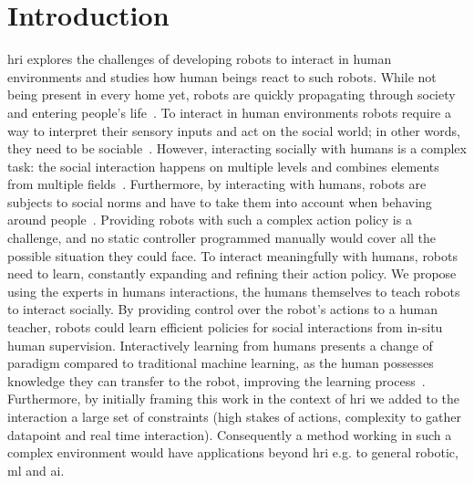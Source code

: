 \chapter{Introduction} \label{chap:intro}
\graphicspath{{images/intro/}}
\glsresetall


\gls{hri} explores the challenges of developing robots to interact in human environments and studies how human beings react to such robots. While not being present in every home yet, robots are quickly propagating through society and entering people's life~\citep{friedman2003hardware,forlizzi2006service}.
To interact in human environments robots require a way to interpret their sensory inputs and act on the social world; in other words, they need to be sociable~\citep{breazeal2004designing}. However, interacting socially with humans is a complex task: the social interaction happens on multiple levels and combines elements from multiple fields~\citep{fong2003survey}. Furthermore, by interacting with humans, robots are subjects to social norms and have to take them into account when behaving around people~\citep{bartneck2004design}. Providing robots with such a complex action policy is a challenge, and no static controller programmed manually would cover all the possible situation they could face. To interact meaningfully with humans, robots need to learn, constantly expanding and refining their action policy. We propose using the experts in humans interactions, the humans themselves to teach robots to interact socially. By providing control over the robot's actions to a human teacher, robots could learn efficient policies for social interactions from in-situ human supervision. Interactively learning from humans presents a change of paradigm compared to traditional machine learning, as the human possesses knowledge they can transfer to the robot, improving the learning process~\citep{fails2003interactive,amershi2014power}. Furthermore, by initially framing this work in the context of \gls{hri} we added to the interaction a large set of constraints (high stakes of actions, complexity to gather datapoint and real time interaction). Consequently a method working in such a complex environment would have applications beyond \gls{hri} e.g. to general robotic, \gls{ml} and \gls{ai}.

